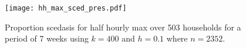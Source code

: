 
\begin{figure}
\centering
\texttt{[image: hh\_max\_sced\_pres.pdf]}
\caption{\label{fig:mysced_hh_max} Proportion scedasis for half hourly max over 503 households for a period of 7 weeks using $k=400$ and $h=0.1$ where $n=2352$.}
\end{figure}


